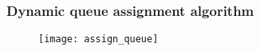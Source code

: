 

\subsubsection{Dynamic queue assignment algorithm}

\begin{figure}[htb]
\centering
\texttt{[image: assign\_queue]}
\caption{}
\label{fig:assign_queue}
\end{figure}

